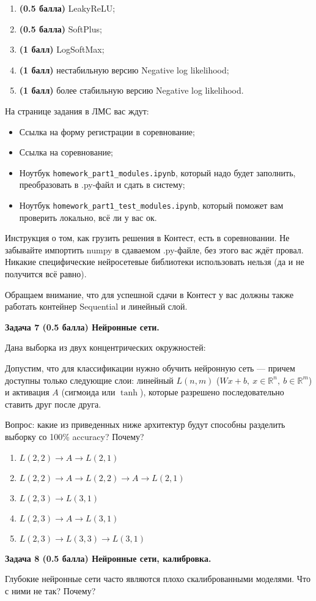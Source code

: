 \documentclass[10pt]{article}
\begin{document}
\begin{enumerate}
\item \textbf{(0.5 балла)} LeakyReLU;
\item \textbf{(0.5 балла)} SoftPlus;
\item \textbf{(1 балл)} LogSoftMax;
\item \textbf{(1 балл)} нестабильную версию Negative log likelihood;
\item \textbf{(1 балл)} более стабильную версию Negative log likelihood.

\end{enumerate}

На странице задания в ЛМС вас ждут:

\begin{itemize}
\item Ссылка на форму регистрации в соревнование;
\item Ссылка на соревнование;
\item Ноутбук \texttt{homework\_part1\_modules.ipynb}, который надо будет заполнить, преобразовать в .py-файл и сдать в систему;
\item Ноутбук \texttt{homework\_part1\_test\_modules.ipynb}, который поможет вам проверить локально, всё ли у вас ок.
\end{itemize}

Инструкция о том, как грузить решения в Контест, есть в соревновании. Не забывайте импортить numpy в сдаваемом .py-файле, без этого вас ждёт провал. Никакие специфические нейросетевые библиотеки использовать нельзя (да и не получится всё равно).

Обращаем внимание, что для успешной сдачи в Контест у вас должны также работать контейнер Sequential и линейный слой.

\bigskip

\textbf{Задача 7 (0.5 балла) Нейронные сети.}


Дана выборка из двух концентрических окружностей:


Допустим, что для классификации нужно обучить нейронную сеть — причем доступны только следующие слои: линейный $L(n, m)$ ($Wx+b,~x\in\mathbb{R}^{n},~b\in\mathbb{R}^{m}$)  и активация $A$  (сигмоида или $\tanh$), которые разрешено последовательно ставить друг после друга.

Вопрос: какие из приведенных ниже архитектур будут способны разделить выборку со 100\% accuracy? Почему?

\begin{enumerate}
    \item $L(2, 2)\to A\to L(2, 1)$
    \item $L(2, 2) \to A \to L(2, 2) \to A \to L(2, 1)$
    \item $L(2, 3) \to L(3, 1)$
    \item $L(2, 3) \to A \to L(3, 1)$
    \item $L(2, 3) \to L(3, 3) \to L(3, 1)$
\end{enumerate}




\bigskip
\textbf{Задача 8 (0.5 балла) Нейронные сети, калибровка.}

Глубокие нейронные сети часто являются плохо скалиброванными моделями. Что с ними не так? Почему?


\bigskip
\end{document}
